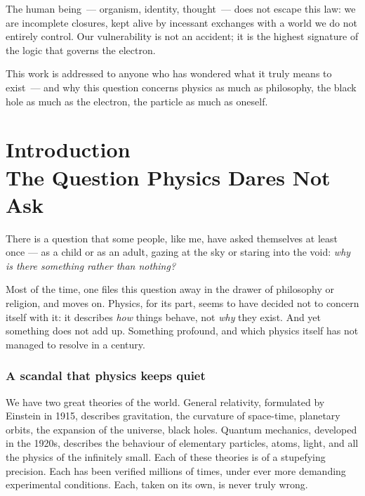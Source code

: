 \documentclass[12pt, a4paper, openright]{book}
\begin{document}
\medskip

The human being~--- organism, identity, thought~--- does not escape this law: we are incomplete closures, kept alive by incessant exchanges with a world we do not entirely control. Our vulnerability is not an accident; it is the highest signature of the logic that governs the electron.

\medskip

This work is addressed to anyone who has wondered what it truly means to exist~--- and why this question concerns physics as much as philosophy, the black hole as much as the electron, the particle as much as oneself.

\newpage

\chapter[Introduction]{Introduction \\ The Question Physics Dares Not Ask}

There is a question that some people, like me, have asked themselves at least once — as a child or as an adult, gazing at the sky or staring into the void: \emph{why is there something rather than nothing?}

\medskip

Most of the time, one files this question away in the drawer of philosophy or religion, and moves on. Physics, for its part, seems to have decided not to concern itself with it: it describes \emph{how} things behave, not \emph{why} they exist. And yet something does not add up. Something profound, and which physics itself has not managed to resolve in a century.

\subsection*{A scandal that physics keeps quiet}

We have two great theories of the world. General relativity, formulated by Einstein in 1915, describes gravitation, the curvature of space-time, planetary orbits, the expansion of the universe, black holes. Quantum mechanics, developed in the 1920s, describes the behaviour of elementary particles, atoms, light, and all the physics of the infinitely small. Each of these theories is of a stupefying precision. Each has been verified millions of times, under ever more demanding experimental conditions. Each, taken on its own, is never truly wrong.
\end{document}
